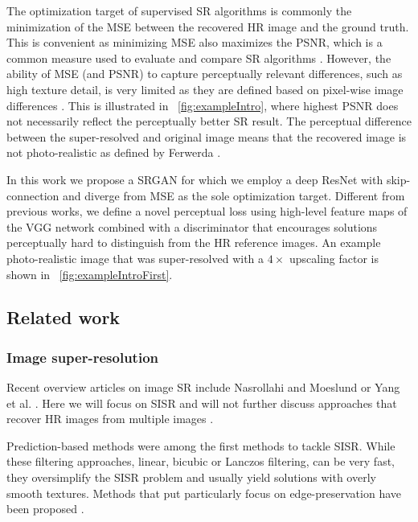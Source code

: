 \documentclass[10pt,twocolumn,letterpaper]{article}
\begin{document}
%
	The optimization target of supervised \ac{SR} algorithms is commonly the minimization of the \ac{MSE} between the recovered \ac{HR} image and the ground truth. This is convenient as minimizing \ac{MSE} also maximizes the \ac{PSNR}, which is a common measure used to evaluate and compare \ac{SR} algorithms \cite{Yang14benchmark}.
	 However, the ability of MSE (and PSNR) to capture perceptually relevant differences, such as high texture detail, is very limited as they are defined based on pixel-wise image differences \cite{Wang2003,Wang2004,Gupta2011}. This is illustrated in \figurename~\ref{fig:exampleIntro}, where highest PSNR does not necessarily reflect the perceptually better \ac{SR} result. The perceptual difference between the super-resolved and original image means that the recovered image is not photo-realistic as defined by Ferwerda \cite{Ferwerda2003}. 
	
	
	In this work we propose a \ac{SRGAN} for which we employ a deep \ac{ResNet} with skip-connection and diverge from \ac{MSE} as the sole optimization target. Different from previous works, we define a novel perceptual loss using high-level feature maps of the VGG network \cite{simonyan2014very,Johnson16PercepLoss,bruna2016super} combined with a discriminator that encourages solutions perceptually hard to distinguish from the \ac{HR} reference images. 
	An example photo-realistic image that was super-resolved with a $4\times$ upscaling factor is shown in \figurename~\ref{fig:exampleIntroFirst}.
	
\subsection{Related work}
\subsubsection{Image super-resolution}
	Recent overview articles on image \ac{SR} include Nasrollahi and Moeslund \cite{Nasrollahi2014} or Yang et al. \cite{Yang14benchmark}. Here we will focus on \ac{SISR} and will not further discuss approaches that recover \ac{HR} images from multiple images \cite{Borman1998aSurvey,Farsiu2004}.
	
	Prediction-based methods were among the first methods to tackle \ac{SISR}. While these filtering approaches, \eg linear, bicubic or Lanczos \cite{Duchon1979} filtering, can be very fast, they oversimplify the \ac{SISR} problem and usually yield solutions with overly smooth textures.
	Methods that put particularly focus on edge-preservation have been proposed \cite{Allebach96, Li2001}.
	
\end{document}
